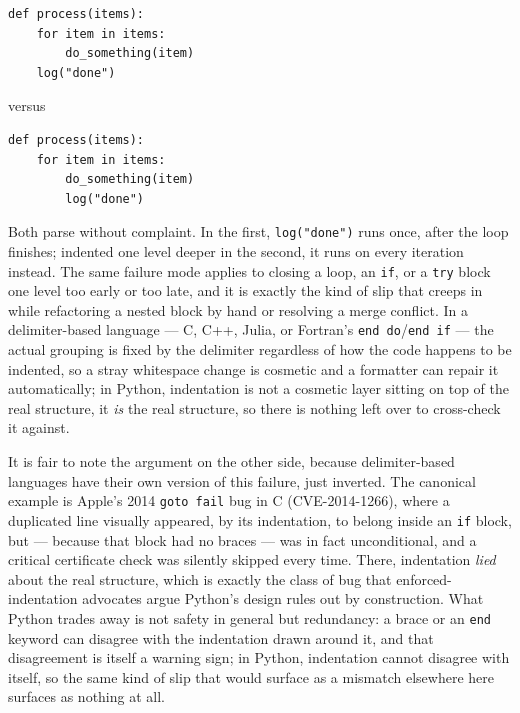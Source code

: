 \begin{verbatim}
def process(items):
    for item in items:
        do_something(item)
    log("done")
\end{verbatim}

\noindent versus

\begin{verbatim}
def process(items):
    for item in items:
        do_something(item)
        log("done")
\end{verbatim}

Both parse without complaint. In the first, \texttt{log("done")} runs once, after the loop finishes; indented one level deeper in the second, it runs on every iteration instead. The same failure mode applies to closing a loop, an \texttt{if}, or a \texttt{try} block one level too early or too late, and it is exactly the kind of slip that creeps in while refactoring a nested block by hand or resolving a merge conflict. In a delimiter-based language --- C, C++, Julia, or Fortran's \texttt{end do}/\texttt{end if} --- the actual grouping is fixed by the delimiter regardless of how the code happens to be indented, so a stray whitespace change is cosmetic and a formatter can repair it automatically; in Python, indentation is not a cosmetic layer sitting on top of the real structure, it \emph{is} the real structure, so there is nothing left over to cross-check it against.

It is fair to note the argument on the other side, because delimiter-based languages have their own version of this failure, just inverted. The canonical example is Apple's 2014 \texttt{goto fail} bug in C (CVE-2014-1266), where a duplicated line visually appeared, by its indentation, to belong inside an \texttt{if} block, but --- because that block had no braces --- was in fact unconditional, and a critical certificate check was silently skipped every time. There, indentation \emph{lied} about the real structure, which is exactly the class of bug that enforced-indentation advocates argue Python's design rules out by construction. What Python trades away is not safety in general but redundancy: a brace or an \texttt{end} keyword can disagree with the indentation drawn around it, and that disagreement is itself a warning sign; in Python, indentation cannot disagree with itself, so the same kind of slip that would surface as a mismatch elsewhere here surfaces as nothing at all.

